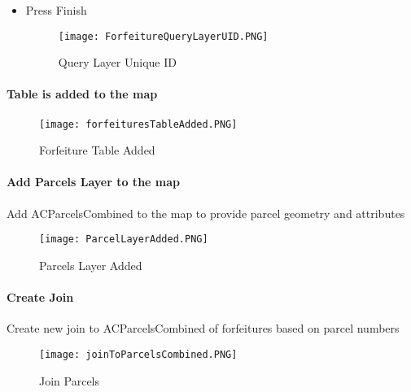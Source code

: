 \documentclass[class=book , crop=false, titlepage, twoside, multi={itemize, figure, verbatim}, float=false]{standalone}
\begin{document}
\begin{itemize}
%
\item Press Finish
%
%
\begin{figure}[h!]
\centering
    \texttt{[image: ForfeitureQueryLayerUID.PNG]}
\caption{Query Layer Unique ID}
\end{figure}
%
%
\end{itemize}
%
\clearpage
%
%
%
\paragraph*{Table is added to the map\texorpdfstring{\\}{}}
%
%
\begin{figure}[h!]
\centering
    \texttt{[image: forfeituresTableAdded.PNG]}
\caption{Forfeiture Table Added}
\end{figure}
\clearpage
%
%
%
\paragraph[Add Parcels Layer to the map]{Add Parcels Layer to the map\texorpdfstring{\\}{}}
%
\noindent Add ACParcelsCombined to the map to provide parcel geometry and attributes

\vspace{.25in}
%
%
\begin{figure}[h!]
\centering
    \texttt{[image: ParcelLayerAdded.PNG]}
\caption{Parcels Layer Added}
\end{figure}
\clearpage
%
%
%
\paragraph[Create Join]{Create Join\texorpdfstring{\\}{}}
%
\noindent Create new join to ACParcelsCombined of forfeitures based on parcel numbers
%
\vspace{.25in}

%
%
\begin{figure}[h!]
\centering
    \texttt{[image: joinToParcelsCombined.PNG]}
\caption{Join Parcels}
\end{figure}
\clearpage
%
%
%
\end{document}
